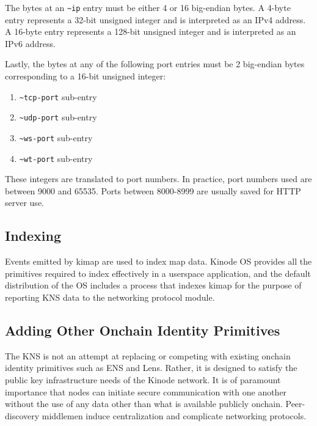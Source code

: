 \documentclass[runningheads]{llncs}
\begin{document}
The bytes at an \verb|~ip| entry must be either 4 or 16 big-endian bytes.
A 4-byte entry represents a 32-bit unsigned integer and is interpreted as an IPv4 address.
A 16-byte entry represents a 128-bit unsigned integer and is interpreted as an IPv6 address.

Lastly, the bytes at any of the following port entries must be 2 big-endian bytes corresponding to a 16-bit unsigned integer:

\begin{enumerate}
	\item \verb|~tcp-port| sub-entry
	\item \verb|~udp-port| sub-entry
	\item \verb|~ws-port| sub-entry
	\item \verb|~wt-port| sub-entry
\end{enumerate}

These integers are translated to port numbers.
In practice, port numbers used are between 9000 and 65535.
Ports between 8000-8999 are usually saved for HTTP server use.

\subsection{Indexing}
\label{sec:knsindexing}

Events emitted by kimap are used to index map data.
Kinode OS provides all the primitives required to index effectively in a userspace application, and the default distribution of the OS includes a process that indexes kimap for the purpose of reporting KNS data to the networking protocol module.

\subsection{Adding Other Onchain Identity Primitives}
\label{sec:knsotherprimitives}

The KNS is not an attempt at replacing or competing with existing onchain identity primitives such as ENS and Lens.
Rather, it is designed to satisfy the public key infrastructure needs of the Kinode network.
It is of paramount importance that nodes can initiate secure communication with one another without the use of any data other than what is available publicly onchain.
Peer-discovery middlemen induce centralization and complicate networking protocols.
\end{document}
